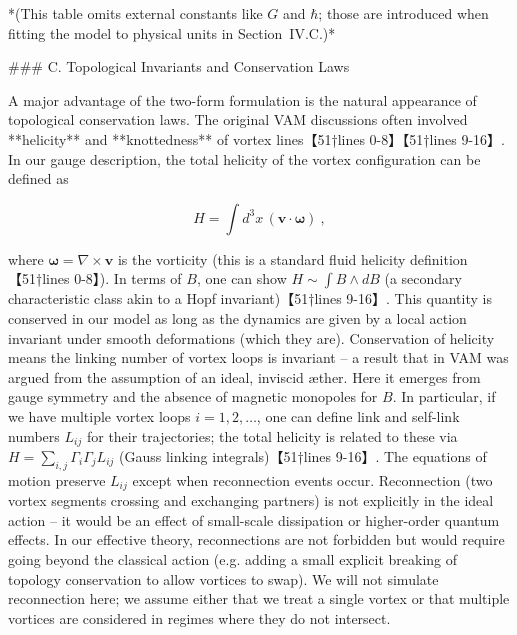 \documentclass[12pt]{article}
\begin{document}
*(This table omits external constants like $G$ and $\hbar$; those are introduced when fitting the model to physical units in Section IV.C.)*

### C. Topological Invariants and Conservation Laws

A major advantage of the two-form formulation is the natural appearance of topological conservation laws. The original VAM discussions often involved **helicity** and **knottedness** of vortex lines【51†lines 0-8】【51†lines 9-16】. In our gauge description, the total helicity of the vortex configuration can be defined as 

\[ H = \int d^3x\, (\mathbf{v}\cdot \mathbf{\omega})~, \] 

where $\mathbf{\omega} = \nabla \times \mathbf{v}$ is the vorticity (this is a standard fluid helicity definition【51†lines 0-8】). In terms of $B$, one can show $H \sim \int B \wedge dB$ (a secondary characteristic class akin to a Hopf invariant)【51†lines 9-16】. This quantity is conserved in our model as long as the dynamics are given by a local action invariant under smooth deformations (which they are). Conservation of helicity means the linking number of vortex loops is invariant – a result that in VAM was argued from the assumption of an ideal, inviscid æther. Here it emerges from gauge symmetry and the absence of magnetic monopoles for $B$. In particular, if we have multiple vortex loops $i=1,2,\dots$, one can define link and self-link numbers $L_{ij}$ for their trajectories; the total helicity is related to these via $H = \sum_{i,j} \Gamma_i \Gamma_j L_{ij}$ (Gauss linking integrals)【51†lines 9-16】. The equations of motion preserve $L_{ij}$ except when reconnection events occur. Reconnection (two vortex segments crossing and exchanging partners) is not explicitly in the ideal action – it would be an effect of small-scale dissipation or higher-order quantum effects. In our effective theory, reconnections are not forbidden but would require going beyond the classical action (e.g. adding a small explicit breaking of topology conservation to allow vortices to swap). We will not simulate reconnection here; we assume either that we treat a single vortex or that multiple vortices are considered in regimes where they do not intersect. 
\end{document}
